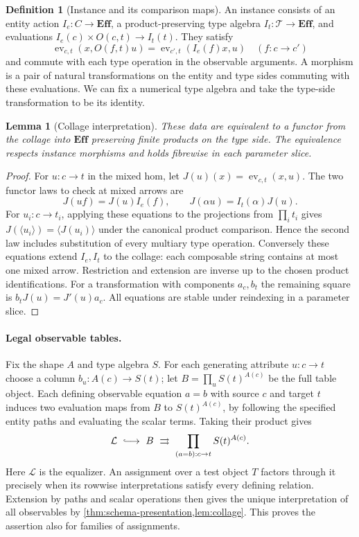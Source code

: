 \documentclass[11pt,a4paper]{article}
\newtheorem{lemma}[lemma]{Lemma}
\theoremstyle{definition}
\newtheorem{definition}[definition]{Definition}
\theoremstyle{remark}\newaliascnt{remark}{theorem}
\newcommand{\E}{\mathbf{Eff}}
\newcommand{\ev}{\operatorname{ev}}
\numberwithin{equation}{section}
\begin{document}
\begin{definition}[Instance and its comparison maps]
An instance consists of an entity action \(I_e:C\to\E\), a product-preserving type algebra \(I_t:\mathcal T\to\E\), and evaluations \(I_e(c)\times O(c,t)\to I_t(t)\). They satisfy
\[
 \ev_{c,t}(x,O(f,t)u)=\ev_{c',t}(I_e(f)x,u)\quad(f:c\to c')
\]
and commute with each type operation in the observable arguments. A morphism is a pair of natural transformations on the entity and type sides commuting with these evaluations. We can fix a numerical type algebra and take the type-side transformation to be its identity.
\end{definition}
\begin{lemma}[Collage interpretation]\label{lem:collage}
These data are equivalent to a functor from the collage into \(\E\) preserving finite products on the type side. The equivalence respects instance morphisms and holds fibrewise in each parameter slice.
\end{lemma}
\begin{proof}
For \(u:c\to t\) in the mixed hom, let \(J(u)(x)=\ev_{c,t}(x,u)\). The two functor laws to check at mixed arrows are
\[
 J(u f)=J(u)I_e(f),\qquad J(\alpha u)=I_t(\alpha)J(u).
\]
For \(u_i:c\to t_i\), applying these equations to the projections from \(\prod_i t_i\) gives \(J(\langle u_i\rangle)=\langle J(u_i)\rangle\) under the canonical product comparison. Hence the second law includes substitution of every multiary type operation. Conversely these equations extend \(I_e,I_t\) to the collage: each composable string contains at most one mixed arrow. Restriction and extension are inverse up to the chosen product identifications. For a transformation with components \(a_c,b_t\) the remaining square is \(b_tJ(u)=J'(u)a_c\). All equations are stable under reindexing in a parameter slice.
\end{proof}

\paragraph{Legal observable tables.}\label{sec:legal-attribute-tables}
Fix the shape \(A\) and type algebra \(S\). For each generating attribute \(u:c\to t\) choose a column \(b_u:A(c)\to S(t)\); let \(B=\prod_u S(t)^{A(c)}\) be the full table object. Each defining observable equation \(a=b\) with source \(c\) and target \(t\) induces two evaluation maps from \(B\) to \(S(t)^{A(c)}\), by following the specified entity paths and evaluating the scalar terms. Taking their product gives
\[
 \mathcal L\ \lhook\joinrel\longrightarrow\ B\
 \rightrightarrows\ \prod_{(a=b):c\to t} S(t)^{A(c)} .
\]
Here \(\mathcal L\) is the equalizer. An assignment over a test object \(T\) factors through it precisely when its rowwise interpretations satisfy every defining relation. Extension by paths and scalar operations then gives the unique interpretation of all observables by \cref{thm:schema-presentation,lem:collage}. This proves the assertion also for families of assignments.
\end{document}
